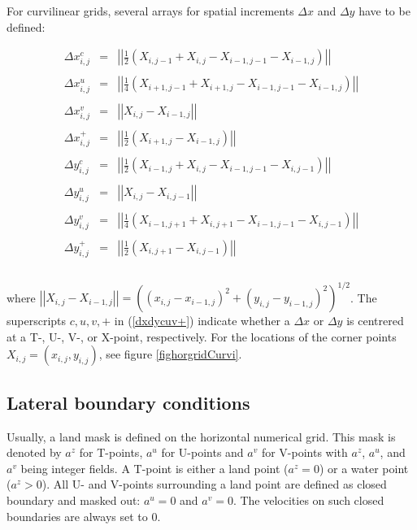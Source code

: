 For curvilinear grids, several arrays for spatial
increments $\Delta x$ and $\Delta y$  have to be defined:  

\begin{equation}\label{dxdycuv+}
\begin{array}{rcl}
\Delta x^c_{i,j}&=&\left|\left|
\frac12(X_{i,j-1}+X_{i,j}-X_{i-1,j-1}-X_{i-1,j}) 
\right|\right|\\ \\
\Delta x^u_{i,j}&=&\left|\left|
\frac14(X_{i+1,j-1}+X_{i+1,j}-X_{i-1,j-1}-X_{i-1,j})\right|\right| \\ \\
\Delta x^v_{i,j}&=& \left|\left|X_{i,j}-X_{i-1,j}\right|\right| \\ \\
\Delta x^+_{i,j}&=&\left|\left|
\frac12(X_{i+1,j}-X_{i-1,j})\right|\right| \\ \\
\Delta y^c_{i,j}&=&\left|\left|
\frac12(X_{i-1,j}+X_{i,j}-X_{i-1,j-1}-X_{i,j-1})\right|\right| \\ \\
\Delta y^u_{i,j}&=&\left|\left|X_{i,j}-X_{i,j-1}\right|\right|
 \\ \\
\Delta y^v_{i,j}&=&\left|\left|
\frac14(X_{i-1,j+1}+X_{i,j+1}-X_{i-1,j-1}-X_{i,j-1})\right|\right| \\ \\
\Delta y^+_{i,j}&=&\left|\left|
\frac12(X_{i,j+1}-X_{i,j-1})\right|\right| \\ \\
\end{array} 
\end{equation}

where $\left|\left|X_{i,j}-X_{i-1,j}\right|\right|
=\left((x_{i,j}-x_{i-1,j})^2+(y_{i,j}-y_{i-1,j})^2\right) ^{1/2}$.
The superscripts $c,u,v,+$ in (\ref{dxdycuv+}) indicate whether a $\Delta x$ or
$\Delta y$ is centrered at a T-, U-, V-, or X-point, respectively.  
For the locations of the corner points $X_{i,j}=(x_{i,j},y_{i,j})$, 
see figure \ref{fighorgridCurvi}. 


\subsection{Lateral boundary conditions}

Usually, a land mask is defined on the horizontal numerical grid.
This mask is denoted by $a^z$\label{az} for T-points, $a^u$\label{au} 
for U-points
and $a^v$\label{av} 
for V-points with $a^z$, $a^u$, and $a^v$ being integer fields. 
A T-point is either a land point ($a^z=0$) or a water point ($a^z>0$).
All U- and V-points surrounding a land point are defined as
closed boundary and masked out: $a^u=0$ and $a^v=0$.
The velocities on such closed boundaries are always set to 0.

